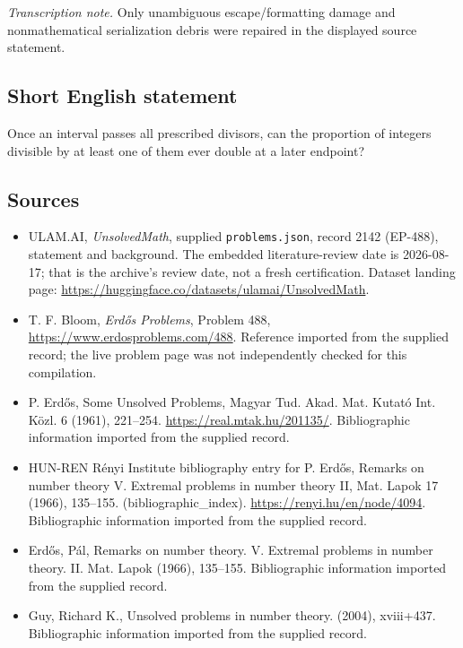 \documentclass[11pt,a4paper]{article}
\begin{document}
{\small\emph{Transcription note.} Only unambiguous escape/formatting damage and nonmathematical serialization debris were repaired in the displayed source statement.}

\subsection{Short English statement}

Once an interval passes all prescribed divisors, can the proportion of integers divisible by at least one of them ever double at a later endpoint?

\subsection{Sources}

{\small

\begin{itemize}

\item[\hypertarget{source:2142:1}{S1}] ULAM.AI, \emph{UnsolvedMath}, supplied \texttt{problems.json}, record 2142 (EP-488), statement and background. The embedded literature-review date is 2026-08-17; that is the archive’s review date, not a fresh certification. Dataset landing page: \url{https://huggingface.co/datasets/ulamai/UnsolvedMath}.

\item[\hypertarget{source:2142:2}{S2}] T. F. Bloom, \emph{Erdős Problems}, Problem 488, \url{https://www.erdosproblems.com/488}. Reference imported from the supplied record; the live problem page was not independently checked for this compilation.

\item[\hypertarget{source:2142:3}{S3}] P. Erdős, Some Unsolved Problems, Magyar Tud. Akad. Mat. Kutató Int. Közl. 6 (1961), 221--254. \url{https://real.mtak.hu/201135/}. Bibliographic information imported from the supplied record.

\item[\hypertarget{source:2142:4}{S4}] HUN-REN Rényi Institute bibliography entry for P. Erdős, Remarks on number theory V. Extremal problems in number theory II, Mat. Lapok 17 (1966), 135--155. (bibliographic\_index). \url{https://renyi.hu/en/node/4094}. Bibliographic information imported from the supplied record.

\item[\hypertarget{source:2142:5}{S5}] Erd\H{o}s, P\'al, Remarks on number theory. {V}. {E}xtremal problems in number theory. {II}. Mat. Lapok (1966), 135--155. Bibliographic information imported from the supplied record.

\item[\hypertarget{source:2142:6}{S6}] Guy, Richard K., Unsolved problems in number theory. (2004), xviii+437. Bibliographic information imported from the supplied record.

\end{itemize}

}

\label{end:2142}
\end{document}
